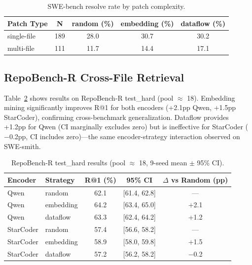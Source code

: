 \documentclass[11pt]{article}
\begin{document}
\begin{table}[h]
\centering
\caption{SWE-bench resolve rate by patch complexity.}
\label{tab:swebench_complexity}
\begin{tabular}{lcccc}
\toprule
\textbf{Patch Type} & \textbf{N} & \textbf{random (\%)} & \textbf{embedding (\%)} & \textbf{dataflow (\%)} \\
\midrule
single-file & 189 & 28.0 & 30.7 & 30.2 \\
multi-file & 111 & 11.7 & 14.4 & 17.1 \\
\bottomrule
\end{tabular}
\end{table}

\subsection{RepoBench-R Cross-File Retrieval}
\label{sec:repobench}

Table~\ref{tab:repobench} shows results on RepoBench-R test\_hard (pool $\approx$ 18).
Embedding mining significantly improves R@1 for both encoders (+2.1pp Qwen, +1.5pp StarCoder), confirming cross-benchmark generalization.
Dataflow provides +1.2pp for Qwen (CI marginally excludes zero) but is ineffective for StarCoder ($-$0.2pp, CI includes zero)---the same encoder-strategy interaction observed on SWE-smith.

\begin{table}[h]
\centering
\caption{RepoBench-R test\_hard results (pool $\approx$ 18, 9-seed mean $\pm$ 95\% CI).}
\label{tab:repobench}
\begin{tabular}{llccc}
\toprule
\textbf{Encoder} & \textbf{Strategy} & \textbf{R@1 (\%)} & \textbf{95\% CI} & \textbf{$\Delta$ vs Random (pp)} \\
\midrule
Qwen & random & 62.1 & [61.4, 62.8] & --- \\
Qwen & embedding & 64.2 & [63.4, 65.0] & +2.1 \\
Qwen & dataflow & 63.3 & [62.4, 64.2] & +1.2 \\
\midrule
StarCoder & random & 57.4 & [56.6, 58.2] & --- \\
StarCoder & embedding & 58.9 & [58.0, 59.8] & +1.5 \\
StarCoder & dataflow & 57.2 & [56.2, 58.2] & $-$0.2 \\
\bottomrule
\end{tabular}
\end{table}
\end{document}
